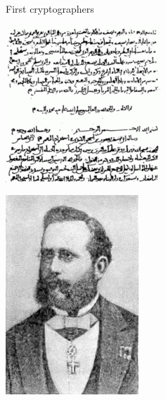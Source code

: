 \documentclass{beamer}
\begin{document}
\begin{frame}{First cryptographers}
    \begin{center}
        \begin{minipage}{0.45\linewidth}
            \includegraphics[width=\linewidth]{fig/Al-kindi_cryptographic.png}
        \end{minipage}
        \hfill
        \begin{minipage}{0.45\linewidth}
            \begin{center}
                \includegraphics[width=0.4\linewidth]{fig/Auguste_Kerckhoffs.jpg}

\end{center}
\end{minipage}
\end{center}
\end{frame}
\end{document}
